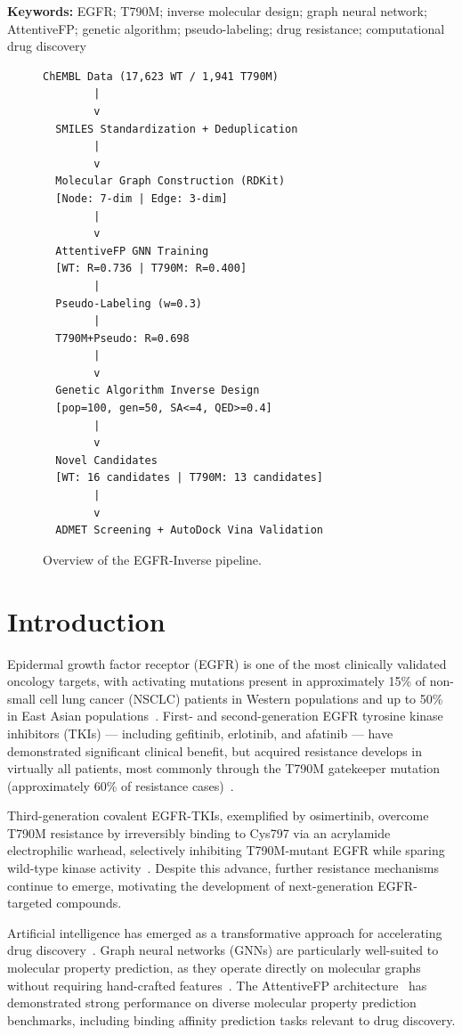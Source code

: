 \documentclass[11pt]{article}
\begin{document}
\textbf{Keywords:} EGFR; T790M; inverse molecular design; graph neural network;
AttentiveFP; genetic algorithm; pseudo-labeling; drug resistance; computational drug discovery


\begin{figure}[h]
\centering
\begin{verbatim}
ChEMBL Data (17,623 WT / 1,941 T790M)
        |
        v
  SMILES Standardization + Deduplication
        |
        v
  Molecular Graph Construction (RDKit)
  [Node: 7-dim | Edge: 3-dim]
        |
        v
  AttentiveFP GNN Training
  [WT: R=0.736 | T790M: R=0.400]
        |
  Pseudo-Labeling (w=0.3)
        |
  T790M+Pseudo: R=0.698
        |
        v
  Genetic Algorithm Inverse Design
  [pop=100, gen=50, SA<=4, QED>=0.4]
        |
        v
  Novel Candidates
  [WT: 16 candidates | T790M: 13 candidates]
        |
        v
  ADMET Screening + AutoDock Vina Validation
\end{verbatim}
\caption{Overview of the EGFR-Inverse pipeline.}
\label{fig:pipeline}
\end{figure}

\section{Introduction}

Epidermal growth factor receptor (EGFR) is one of the most clinically validated
oncology targets, with activating mutations present in approximately 15\% of
non-small cell lung cancer (NSCLC) patients in Western populations and up to
50\% in East Asian populations~\cite{mok2009}. First- and second-generation
EGFR tyrosine kinase inhibitors (TKIs) --- including gefitinib, erlotinib, and
afatinib --- have demonstrated significant clinical benefit, but acquired resistance
develops in virtually all patients, most commonly through the T790M gatekeeper
mutation (approximately 60\% of resistance cases)~\cite{yu2013}.

Third-generation covalent EGFR-TKIs, exemplified by osimertinib, overcome T790M
resistance by irreversibly binding to Cys797 via an acrylamide electrophilic
warhead, selectively inhibiting T790M-mutant EGFR while sparing wild-type
kinase activity~\cite{cross2014}. Despite this advance, further resistance
mechanisms continue to emerge, motivating the development of next-generation
EGFR-targeted compounds.

Artificial intelligence has emerged as a transformative approach for accelerating
drug discovery~\cite{stokes2020}. Graph neural networks (GNNs) are particularly
well-suited to molecular property prediction, as they operate directly on molecular
graphs without requiring hand-crafted features~\cite{duvenaud2015, xiong2019}.
The AttentiveFP architecture~\cite{xiong2019} has demonstrated strong performance
on diverse molecular property prediction benchmarks, including binding affinity
prediction tasks relevant to drug discovery.
\end{document}
